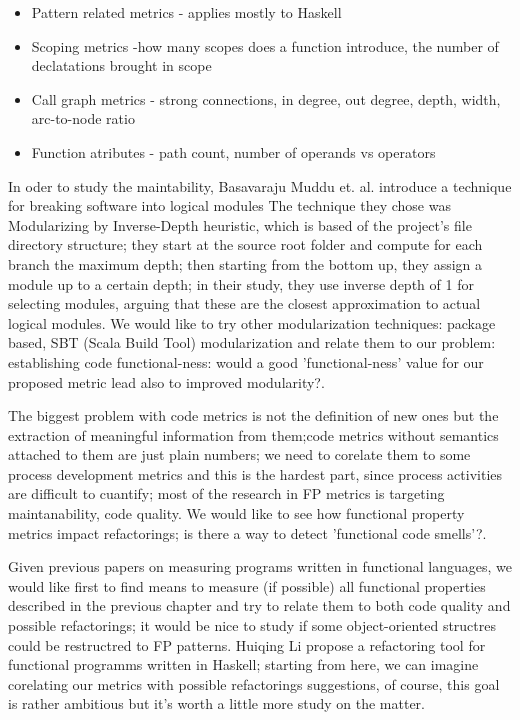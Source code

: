 \documentclass{article}
\begin{document}
\begin{itemize}
\item Pattern related metrics - applies mostly to Haskell
\item Scoping metrics -how many scopes does a function introduce, the number of declatations brought in scope
\item Call graph metrics - strong connections, in degree, out degree, depth, width, arc-to-node ratio
\item Function atributes - path count, number of operands vs operators
\end{itemize}

In oder to study the maintability, Basavaraju Muddu et. al. introduce a technique for breaking software into logical modules \cite{DBLP:conf/icse/MudduABP13} The technique they chose was Modularizing by  Inverse-Depth heuristic, which is based of the project's file directory structure; they start at the source root folder and compute for each branch the maximum depth; then starting from the bottom up, they assign a module up to a certain depth; in their study, they use inverse depth of 1 for selecting modules, arguing that these are the closest approximation to actual logical modules. We would like to try other modularization techniques: package based, SBT (Scala Build Tool)  modularization and relate them to our problem: establishing code functional-ness: would a good 'functional-ness' value for our proposed metric lead also to improved modularity?.\par

The biggest problem with code metrics is not the definition of new ones but the extraction of  meaningful information from them;code metrics without semantics attached to them are just plain numbers; we need to corelate them to some process development metrics and this is the hardest part, since process activities are difficult to cuantify; most of the research in FP metrics is targeting maintanability, code quality. We would like to see how functional property metrics impact refactorings; is there a way to detect 'functional code smells'?.  \par

Given previous papers on measuring programs written in functional languages, we would like first to find means to measure (if possible) all functional properties described in the previous chapter and try to relate them to both code quality and possible refactorings; it would be nice to study if some object-oriented structres could be restructred to FP patterns. Huiqing Li propose a refactoring tool for functional programms written in Haskell\cite{Li:2003:TSR:871895.871899}; starting from here, we can imagine corelating our metrics with possible refactorings suggestions, of course, this goal is rather ambitious but it's worth a little more study on the matter.
\end{document}
